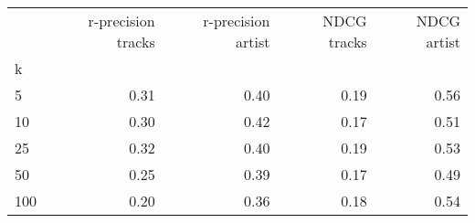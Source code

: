 \documentclass{standalone}
\begin{document}
\begin{tabular}{lrrrr}
\toprule
{} & r-precision tracks & r-precision artist & NDCG tracks & NDCG artist \\
k   &                   &                   &             &             \\
\midrule
5   &              0.31 &              0.40 &        0.19 &        0.56 \\
10  &              0.30 &              0.42 &        0.17 &        0.51 \\
25  &              0.32 &              0.40 &        0.19 &        0.53 \\
50  &              0.25 &              0.39 &        0.17 &        0.49 \\
100 &              0.20 &              0.36 &        0.18 &        0.54 \\
\bottomrule
\end{tabular}
\end{document}
